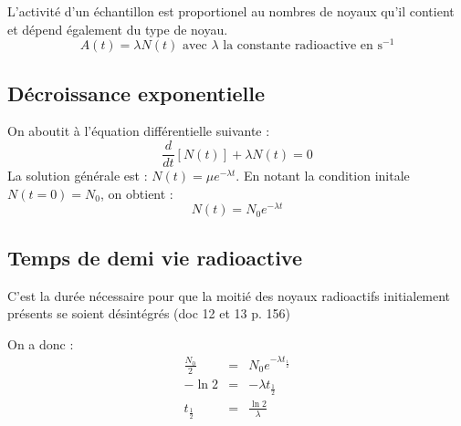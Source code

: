 \begin{definition}\label{def:radcste}
    L'activité d'un échantillon est proportionel au nombres de noyaux qu'il contient et dépend également du type de noyau. 
    \[
        A(t) = \lambda N(t) \text{ avec $\lambda$ la constante radioactive en s$^{-1}$}
    \]
\end{definition}

\subsection{Décroissance exponentielle }
On aboutit à l'équation différentielle suivante : 
\[
    \frac{d}{dt}\left[ N(t) \right] + \lambda N(t) = 0
\]
La solution générale est : \(N(t) =  \mu e^{-\lambda t}\). En notant la condition initale \(N(t =0) = N_{0}\), on obtient :
\[
    N(t) = N_{0}e^{-\lambda t}
\]
\pagebreak

\subsection{Temps de demi vie radioactive}
\begin{definition}
    C'est la durée nécessaire pour que la moitié des noyaux radioactifs initialement présents se soient désintégrés (doc 12 et 13 p. 156)
\end{definition}

On a donc : 
\begin{eqnarray*}
    \frac{N_{0}}{2} &=& N_{0}e^{-\lambda t_{\frac{1}{2}}} \\
    -\ln 2 &=& -\lambda t_{\frac{1}{2}}\\
    t_{\frac{1}{2}} &=& \frac{\ln 2}{\lambda } 
\end{eqnarray*}
